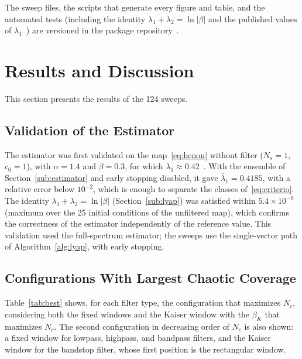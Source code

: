 \documentclass[journal]{IEEEtran}
\begin{document}
The sweep files, the scripts that generate every figure and table, and the
automated tests (including the identity $\lambda_1+\lambda_2=\ln|\beta|$ and
the published values of $\lambda_1$~\cite{Sprott2003,Wolf1985}) are versioned
in the package repository~\cite{chaoticPFC2026}.

\section{Results and Discussion}\label{sec:results}
This section presents the results of the 124 sweeps.

\subsection{Validation of the Estimator}\label{sub:validation}
The estimator was first validated on the map~\eqref{eq:henon} without filter
($N_s=1$, $c_0=1$), with $\alpha=1.4$ and $\beta=0.3$, for which
$\lambda_1\approx0.42$~\cite{Wolf1985,Sprott2003}. With the
ensemble of Section~\ref{sub:estimator} and early stopping disabled, it gave
$\bar\lambda_1=0.4185$, with a relative error below $10^{-2}$, which is enough
to separate the classes of~\eqref{eq:criterio}. The identity
$\lambda_1+\lambda_2=\ln|\beta|$ (Section~\ref{sub:lyap}) was satisfied within
$5.4\times10^{-9}$ (maximum over the 25 initial conditions of the unfiltered map),
which confirms the
correctness of the estimator independently of the reference value. This
validation used the full-spectrum estimator; the sweeps use the single-vector
path of Algorithm~\ref{alg:lyap}, with early stopping.

\subsection{Configurations With Largest Chaotic Coverage}\label{sub:classification}
Table~\ref{tab:best} shows, for each filter type, the configuration that
maximizes $N_c$, considering both the fixed windows and the Kaiser window with
the $\beta_K$ that maximizes $N_c$. The second configuration in decreasing
order of $N_c$ is also shown: a fixed window for lowpass, highpass, and
bandpass filters, and the Kaiser window for the bandstop filter, whose first
position is the rectangular window.
\end{document}
